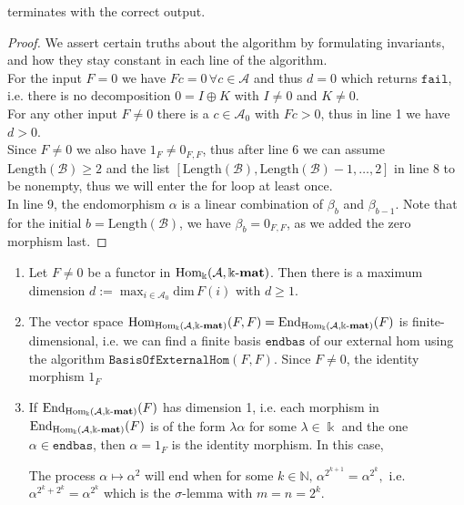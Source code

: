 \begin{lemma}
 terminates with the correct output.
\end{lemma}
\begin{proof} We assert certain truths about the algorithm by formulating invariants, and how they stay constant in each line of the algorithm.\\

\noindent For the input $F = 0$ we have $Fc = 0\,\forall c \in \mathcal{A}$ and thus $d = 0$ which returns $\mathtt{fail}$, i.e. there is no
decomposition $0 = I \oplus K$ with $I \neq 0$ and $K \neq 0$.\\

\noindent For any other input $F \neq 0$ there is a $c \in \mathcal{A}_{0}$ with $Fc > 0$, thus in line 1 we have $d > 0$.\\
Since $F \neq 0$ we also have $1_{F} \neq 0_{F,F}$, thus after line 6 we can assume $\mathrm{Length}(\mathcal{B}) \geq 2$ and
the list $[\mathrm{Length}(\mathcal{B}),\mathrm{Length}(\mathcal{B}) - 1,\dots,2]$ in line 8 to be nonempty, thus we will enter the for loop
at least once.\\
In line 9, the endomorphism $\alpha$ is a linear combination of $\beta_{b}$ and $\beta_{b-1}$. Note that for the initial
$b = \mathrm{Length}(\mathcal{B})$, we have $\beta_{b} = 0_{F,F}$, as we added the zero morphism last.
\end{proof}



\begin{enumerate}
\renewcommand{\labelenumi}{(\theenumi)}
\item Let $F \neq 0$ be a functor in $\mathrm{Hom_{\Bbbk}}(\mathcal{A},\Bbbk\textnormal{-}\mathbf{mat})$. Then there is a maximum dimension $d := \max_{i \in \mathcal{A}_{0}} \mathrm{dim}\, F(i)$ with
$d \geq 1$.
\item The vector space $\mathrm{Hom}_{\mathrm{Hom_{\Bbbk}}(\mathcal{A},\Bbbk\textnormal{-}\mathbf{mat})}(F,F) = \mathrm{End}_{\mathrm{Hom_{\Bbbk}}(\mathcal{A},\Bbbk\textnormal{-}\mathbf{mat})}(F)$ is finite-dimensional, i.e. we can find a
finite basis $\mathtt{endbas}$ of our external hom using the algorithm $\mathtt{BasisOfExternalHom}(F,F)$. Since $F \neq 0$, the
identity morphism $1_{F}$ 
\item If $\mathrm{End}_{\mathrm{Hom_{\Bbbk}}(\mathcal{A},\Bbbk\textnormal{-}\mathbf{mat})}(F)$ has dimension 1, i.e. each morphism in $\mathrm{End}_{\mathrm{Hom_{\Bbbk}}(\mathcal{A},\Bbbk\textnormal{-}\mathbf{mat})}(F)$ is of the form
$\lambda \alpha$ for some $\lambda \in \Bbbk$ and the one $\alpha \in \mathtt{endbas}$, then $\alpha = 1_{F}$ is the identity morphism.
In this case, 

The process $\alpha \mapsto \alpha^{2}$ will end when for some $k \in \mathbb{N},\, \alpha^{2^{k+1}} = \alpha^{2^{k}},$ i.e.
$\alpha^{2^{k}+2^{k}} = \alpha^{2^{k}}$ which is the $\sigma$-lemma with $m = n = 2^{k}$.

\end{enumerate}

